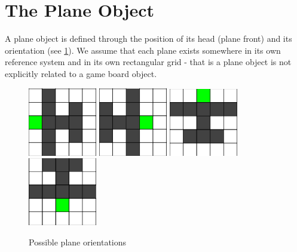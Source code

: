 \documentclass{article}
\begin{document}
\section{The Plane Object}
A plane object is defined through the position of its head  (plane front) and its orientation (see \ref{fig:plane_orientations}).  We assume that each plane exists somewhere in its own reference system and in its own rectangular grid - that is a plane object is not explicitly related to a game board object. 

\begin{figure}[h]
  \includegraphics[width = 3cm]{PlaneEastWest.png}
  \includegraphics[width = 3cm]{PlaneWestEast.png}
  \includegraphics[width = 3cm]{PlaneNorthSouth.png}
  \includegraphics[width = 3cm]{PlaneSouthNorth.png}
  \caption{Possible plane orientations}
  \label{fig:plane_orientations}
\end{figure}
\end{document}
